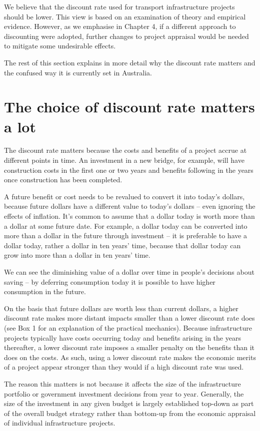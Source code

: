 We believe that the discount rate used for transport infrastructure projects should be lower. This view is based on an examination of theory and empirical evidence. However, as we emphasise in Chapter 4, if a different approach to discounting were adopted, further changes to project appraisal would be needed to mitigate some undesirable effects.

The rest of this section explains in more detail why the discount rate matters and the confused way it is currently set in Australia.


\section{The choice of discount rate matters a lot}

The discount rate matters because the costs and benefits of a project accrue at different points in time. An investment in a new bridge, for example, will have construction costs in the first one or two years and benefits following in the years once construction has been completed. 

A future benefit or cost needs to be revalued to convert it into today’s dollars, because future dollars have a different value to today’s dollars – even ignoring the effects of inflation. It’s common to assume that a dollar today is worth more than a dollar at some future date. For example, a dollar today can be converted into more than a dollar in the future through investment -- it is preferable to have a dollar today, rather a dollar in ten years’ time, because that dollar today can grow into more than a dollar in ten years’ time. 

We can see the diminishing value of a dollar over time in people’s decisions about saving -- by deferring consumption today it is possible to have higher consumption in the future. 

On the basis that future dollars are worth less than current dollars, a higher discount rate makes more distant impacts smaller than a lower discount rate does (see Box 1 for an explanation of the practical mechanics). Because infrastructure projects typically have costs occurring today and benefits arising in the years thereafter, a lower discount rate imposes a smaller penalty on the benefits than it does on the costs. As such, using a lower discount rate makes the economic merits of a project appear stronger than they would if a high discount rate was used. 

The reason this matters is not because it affects the size of the infrastructure portfolio or government investment decisions from year to year. Generally, the size of the investment in any given budget is largely established top-down as part of the overall budget strategy rather than bottom-up from the economic appraisal of individual infrastructure projects.

